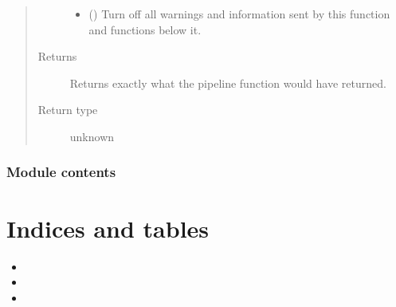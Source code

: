 \documentclass[letterpaper,10pt,english]{sphinxmanual}
\begin{document}
\begin{fulllineitems}
\begin{quote}
\begin{description}
\begin{itemize}
\item {} 
 (\sphinxstyleliteralemphasis{\sphinxupquote{ (}}\sphinxstyleliteralemphasis{\sphinxupquote{)}}) \textendash{} Turn off all warnings and information sent by this function and
functions below it.

\end{itemize}

\item[{Returns}] \leavevmode
{} \textendash{} Returns exactly what the pipeline function would have returned.

\item[{Return type}] \leavevmode
unknown

\end{description}\end{quote}

\end{fulllineitems}



\subsection{Module contents}
\label{\detokenize{python_docstrings/IfA_Smeargle:module-IfA_Smeargle}}\label{\detokenize{python_docstrings/IfA_Smeargle:module-contents}}

\chapter{Indices and tables}
\label{\detokenize{index:indices-and-tables}}\begin{itemize}
\item {} 

\item {} 

\item {} 

\end{itemize}
\end{document}
